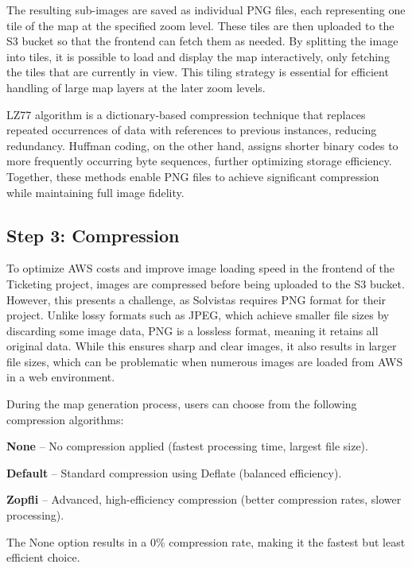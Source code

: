 The resulting sub-images are saved as individual PNG files, each representing one tile of the map at the specified zoom level. These tiles are then uploaded to the S3 bucket so that the frontend can fetch them as needed. By splitting the image into tiles, it is possible to load and display the map interactively, only fetching the tiles that are currently in view. This tiling strategy is essential for efficient handling of large map layers at the later zoom levels.

LZ77 algorithm is a dictionary-based compression technique that replaces repeated occurrences of data with references to previous instances, reducing redundancy. Huffman coding, on the other hand, assigns shorter binary codes to more frequently occurring byte sequences, further optimizing storage efficiency. Together, these methods enable PNG files to achieve significant compression while maintaining full image fidelity.

\subsection{Step 3: Compression}

To optimize AWS costs and improve image loading speed in the frontend of the Ticketing project, images are compressed before being uploaded to the S3 bucket. However, this presents a challenge, as Solvistas requires PNG format for their project. Unlike lossy formats such as JPEG, which achieve smaller file sizes by discarding some image data, PNG is a lossless format, meaning it retains all original data. While this ensures sharp and clear images, it also results in larger file sizes, which can be problematic when numerous images are loaded from AWS in a web environment.


During the map generation process, users can choose from the following compression algorithms:

\begin{compactitem}
    
\item{}\textbf{None} – No compression applied (fastest processing time, largest file size).
\item{}\textbf{Default} – Standard compression using Deflate (balanced efficiency).
\item{}\textbf{Zopfli} – Advanced, high-efficiency compression (better compression rates, slower processing).
\end{compactitem}

The None option results in a 0\% compression rate, making it the fastest but least efficient choice.


